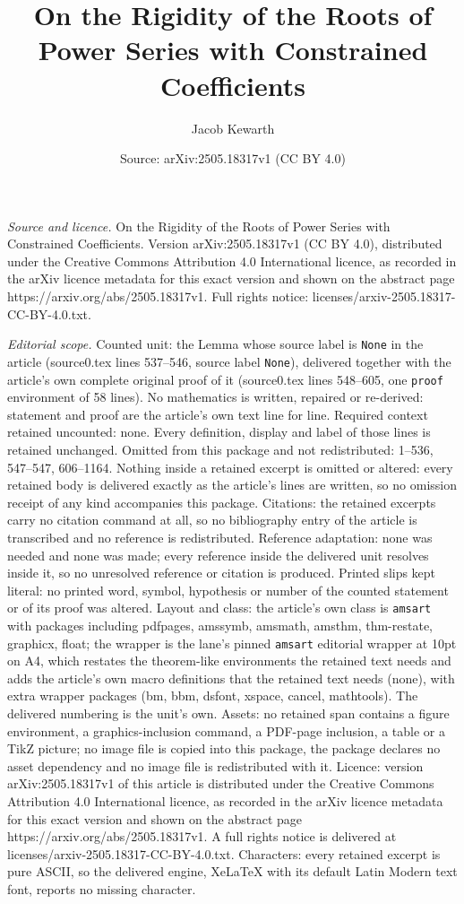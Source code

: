 \documentclass[10pt,a4paper]{amsart}
\title[On the Rigidity of the Roots of Power Series with Constraine]{On the Rigidity of the Roots of Power Series with Constrained Coefficients}
\author{Jacob Kewarth}
\date{Source: arXiv:2505.18317v1 (CC BY 4.0)}
\begin{document}
\maketitle

\noindent\emph{Source and licence.} On the Rigidity of the Roots of Power Series with Constrained Coefficients. Version arXiv:2505.18317v1 (CC BY 4.0), distributed under the Creative Commons Attribution 4.0 International licence, as recorded in the arXiv licence metadata for this exact version and shown on the abstract page https://arxiv.org/abs/2505.18317v1. Full rights notice: licenses/arxiv-2505.18317-CC-BY-4.0.txt.\par\smallskip

\noindent\textit{Editorial scope.} Counted unit: the Lemma whose source label is \texttt{None} in the article (source0.tex lines 537--546, source label \texttt{None}), delivered together with the article's own complete original proof of it (source0.tex lines 548--605, one \texttt{proof} environment of 58 lines). No mathematics is written, repaired or re-derived: statement and proof are the article's own text line for line. Required context retained uncounted: none. Every definition, display and label of those lines is retained unchanged. Omitted from this package and not redistributed: 1--536, 547--547, 606--1164. Nothing inside a retained excerpt is omitted or altered: every retained body is delivered exactly as the article's lines are written, so no omission receipt of any kind accompanies this package. Citations: the retained excerpts carry no citation command at all, so no bibliography entry of the article is transcribed and no reference is redistributed. Reference adaptation: none was needed and none was made; every reference inside the delivered unit resolves inside it, so no unresolved reference or citation is produced. Printed slips kept literal: no printed word, symbol, hypothesis or number of the counted statement or of its proof was altered. Layout and class: the article's own class is \texttt{amsart} with packages including pdfpages, amssymb, amsmath, amsthm, thm-restate, graphicx, float; the wrapper is the lane's pinned \texttt{amsart} editorial wrapper at 10pt on A4, which restates the theorem-like environments the retained text needs and adds the article's own macro definitions that the retained text needs (none), with extra wrapper packages (bm, bbm, dsfont, xspace, cancel, mathtools). The delivered numbering is the unit's own. Assets: no retained span contains a figure environment, a graphics-inclusion command, a PDF-page inclusion, a table or a TikZ picture; no image file is copied into this package, the package declares no asset dependency and no image file is redistributed with it. Licence: version arXiv:2505.18317v1 of this article is distributed under the Creative Commons Attribution 4.0 International licence, as recorded in the arXiv licence metadata for this exact version and shown on the abstract page https://arxiv.org/abs/2505.18317v1. A full rights notice is delivered at licenses/arxiv-2505.18317-CC-BY-4.0.txt. Characters: every retained excerpt is pure ASCII, so the delivered engine, XeLaTeX with its default Latin Modern text font, reports no missing character.
\end{document}

